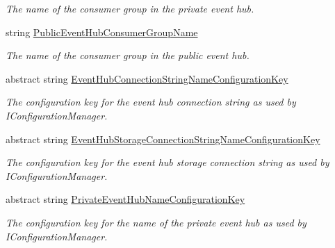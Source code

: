 \begin{DoxyCompactItemize}
\begin{DoxyCompactList}\small\item\em The name of the consumer group in the private event hub. \end{DoxyCompactList}\item 
string \hyperlink{classCqrs_1_1Azure_1_1ServiceBus_1_1AzureEventHub_a505c495eb73e4f888431d408e0b0d8ab_a505c495eb73e4f888431d408e0b0d8ab}{Public\+Event\+Hub\+Consumer\+Group\+Name}
\begin{DoxyCompactList}\small\item\em The name of the consumer group in the public event hub. \end{DoxyCompactList}\item 
abstract string \hyperlink{classCqrs_1_1Azure_1_1ServiceBus_1_1AzureEventHub_ad77526406b246313591e11b90e1a67d5_ad77526406b246313591e11b90e1a67d5}{Event\+Hub\+Connection\+String\+Name\+Configuration\+Key}
\begin{DoxyCompactList}\small\item\em The configuration key for the event hub connection string as used by I\+Configuration\+Manager. \end{DoxyCompactList}\item 
abstract string \hyperlink{classCqrs_1_1Azure_1_1ServiceBus_1_1AzureEventHub_ad400a17bf61c218e6330cd6500458801_ad400a17bf61c218e6330cd6500458801}{Event\+Hub\+Storage\+Connection\+String\+Name\+Configuration\+Key}
\begin{DoxyCompactList}\small\item\em The configuration key for the event hub storage connection string as used by I\+Configuration\+Manager. \end{DoxyCompactList}\item 
abstract string \hyperlink{classCqrs_1_1Azure_1_1ServiceBus_1_1AzureEventHub_a286a7ddc6becff4d549434d2abe82ed1_a286a7ddc6becff4d549434d2abe82ed1}{Private\+Event\+Hub\+Name\+Configuration\+Key}
\begin{DoxyCompactList}\small\item\em The configuration key for the name of the private event hub as used by I\+Configuration\+Manager. \end{DoxyCompactList}\item 

\end{DoxyCompactItemize}

